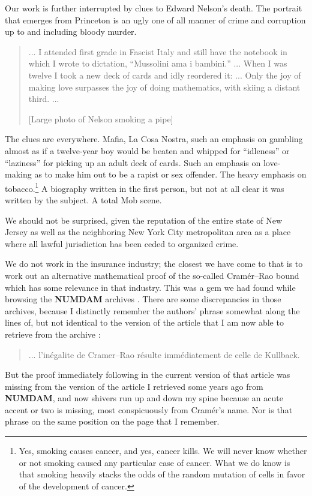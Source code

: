 \documentclass[letterpaper]{article}
\begin{document}
Our work is further interrupted by clues to Edward Nelson's death.  The portrait that emerges from Princeton \cite{cook2009nelson} is an ugly one of all manner of crime and corruption up to and including bloody murder.
\begin{quotation}
... I attended first grade in Fascist Italy and still have the notebook in which I wrote to dictation, ``\foreignlanguage{italian}{Mussolini ama i bambini.}'' ... When I was twelve I took a new deck of cards and idly reordered it: ... Only the joy of making love surpasses the joy of doing mathematics, with skiing a distant third. ...

[Large photo of Nelson smoking a pipe]
\end{quotation}
The clues are everywhere.  Mafia, \foreignlanguage{italian}{La Cosa Nostra}, such an emphasis on gambling almost as if a twelve-year boy would be beaten and whipped for ``idleness'' or ``laziness'' for picking up an adult deck of cards.  Such an emphasis on love-making as to make him out to be a rapist or sex offender.  The heavy emphasis on tobacco.\footnote{Yes, smoking causes cancer, and yes, cancer kills.  We will never know whether or not smoking caused any particular case of cancer.  What we do know is that smoking heavily stacks the odds of the random mutation of cells in favor of the development of cancer.}  A biography written in the first person, but not at all clear it was written by the subject.  A total Mob scene.

We should not be surprised, given the reputation of the entire state of New Jersey as well as the neighboring New York City metropolitan area as a place where all lawful jurisdiction has been ceded to organized crime.

We do not work in the insurance industry; the closest we have come to that is to work out an alternative mathematical proof \cite{wiki2009kullbacks} of the so-called Cram{\'e}r--Rao bound \cite{cramer1946,rao1945} which has some relevance in that industry.  This was a gem \cite{fuchs1970inegalite} we had found while browsing the \textbf{NUMDAM} archives \cite{numdam}.  There are some discrepancies in those archives, because I distinctly remember the authors' phrase somewhat along the lines of, but not identical to the version of the article that I am now able to retrieve from the archive \cite[p.~119]{fuchs1970inegalite}:
\begin{quote}\small
	\foreignlanguage{french}{... l'in{\'e}galite de Cramer--Rao r{\'e}sulte imm{\'e}diatement de celle de Kullback.}
\end{quote}
But the proof immediately following in the current version of that article was missing from the version of the article I retrieved some years ago from \textbf{NUMDAM}, and now shivers run up and down my spine because an acute accent or two is missing, most conspicuously from Cram{\'e}r's name.  Nor is that phrase on the same position on the page that I remember.
\end{document}
